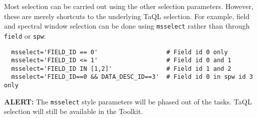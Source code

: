 Most selection can be carried out using the other
selection parameters.  However, these are merely shortcuts
to the underlying TaQL selection.  For example, field
and spectral window selection can be done using {\tt msselect}
rather than through {\tt field} or {\tt spw}:
\small
\begin{verbatim}
  msselect='FIELD_ID == 0'                   # Field id 0 only
  msselect='FIELD_ID <= 1'                   # Field id 0 and 1
  msselect='FIELD_ID IN [1,2]'               # Field id 1 and 2
  msselect='FIELD_ID==0 && DATA_DESC_ID==3'  # Field id 0 in spw id 3 only
\end{verbatim}
\normalsize

{\bf ALERT:} The {\tt msselect} style parameters will be phased
out of the tasks.  TaQL selection will still be available in the
Toolkit.

